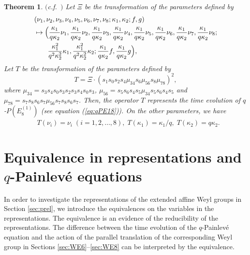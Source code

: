 \documentclass[12pt]{amsart}
\numberwithin{equation}{section}
\newtheorem{thm}[prop]{\bf Theorem}
\theoremstyle{definition}
\begin{document}
\begin{thm} $($c.f.~\cite[Appendix A]{Y}$)$  \label{thm:E8TW}
Let $\Xi $ be the transformation of the parameters defined by
\begin{align}
& (\nu_1 , \nu_2 , \nu_3 , \nu_4 ,\nu_5 ,\nu_6 , \nu_7 ,\nu_8 ;\kappa_1 ,\kappa_2 ; f ,g) \label{eq:E8Xi} \\
& \mapsto  \Bigl( \frac{\kappa_1  }{ q \kappa_2 } \nu _1 ,\frac{\kappa_1  }{ q \kappa_2 } \nu _2 ,\frac{\kappa_1  }{ q \kappa_2 } \nu _3 ,\frac{\kappa_1  }{ q \kappa_2 } \nu _4 ,\frac{\kappa_1  }{ q \kappa_2 } \nu _5 ,\frac{\kappa_1  }{ q \kappa_2 } \nu _6 ,\frac{\kappa_1  }{ q \kappa_2 } \nu _7 ,\frac{\kappa_1  }{ q \kappa_2 } \nu _8  ; \nonumber \\
& \qquad \frac{\kappa_1^2}{q^2 \kappa _2^2 } \kappa_1,\frac{\kappa_1^2 }{q^2 \kappa ^2_2 } \kappa _2; \frac{\kappa_1}{q \kappa _2} f , \frac{\kappa_1}{q \kappa _2} g \Bigr) ,\nonumber
\end{align}
Let $T$ be the transformation of the parameters defined by 
\begin{equation}
T= \Xi \cdot (  s_1 s_{0} s_{2} s_{4} \mu_{34} s_{6} \mu_{56} s_{8} \mu_{78}   )^2 , \label{eq:E8TXis}
\end{equation}
where $\mu _{34} = s_{3} s_{4} s_{0} s_{3} s_{2} s_{3} s_{4} s_{0} s_{3}$, $\mu _{56} = s_{5} s_{6} s_{4} s_{5} \mu _{34} s_{5} s_{6} s_{4} s_{5}$ and $\mu _{78} = s_{7} s_{8} s_{6} s_{7} \mu _{56} s_{7} s_{8} s_{6} s_{7}$.
Then, the operator $T$ represents the time evolution of $q$-$P(E^{(1)}_8)$ (see equation (\ref{eq:qPE18})).
On the other parameters, we have
\begin{align}
& \displaystyle T(\nu _i)= \nu _i \; (i=1,2,\dots ,8) , \;  T(\kappa _1 ) =  \kappa _1  / q , \; T(\kappa _2 ) = q \kappa _2  . \label{eq:E8T} 
\end{align}
\end{thm}

\section{Equivalence in representations and $q$-Painlev\'e equations} \label{sec:equiv}

In order to investigate the representations of the extended affine Weyl groups in Section \ref{sec:prel}, we introduce the equivalences on the variables in the representations.
The equivalence is an evidence of the reducibility of the representations.
The difference between the time evolution of the $q$-Painlev\'e equation and the action of the parallel translation of the corresponding Weyl group in Sections \ref{sec:WE6}--\ref{sec:WE8} can be interpreted by the equivalence.
\end{document}
